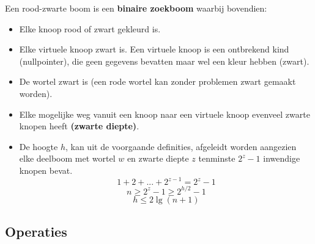 \documentclass{report}
\begin{document}
	Een rood-zwarte boom is een \textbf{binaire zoekboom} waarbij bovendien:
	\begin{itemize}
		\item Elke knoop rood of zwart gekleurd is.
		\item Elke virtuele knoop zwart is. Een virtuele knoop is een ontbrekend kind (nullpointer), die geen gegevens bevatten maar wel een kleur hebben (zwart).
		\item De wortel zwart is (een rode wortel kan zonder problemen zwart gemaakt worden).
		\item Elke mogelijke weg vanuit een knoop naar een virtuele knoop evenveel zwarte knopen heeft \textbf{(zwarte diepte)}.
		\item De hoogte $h$, kan uit de voorgaande definities, afgeleidt worden aangezien elke deelboom met wortel $w$ en zwarte diepte $z$ tenminste $2^z - 1$ inwendige knopen bevat. 
		$$1 + 2 + ... + 2^{z - 1} = 2^z - 1$$ 
		$$n \geq 2^z - 1 \geq 2^{h/2} - 1$$
		$$h \leq 2\lg(n + 1)$$
	\end{itemize}
	\subsection{Operaties}
\end{document}
